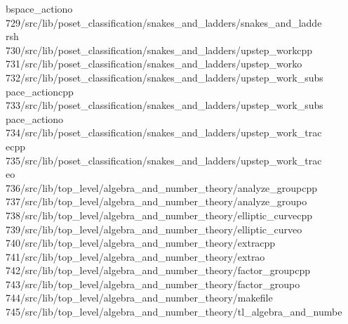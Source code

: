 \begin{tabbing}
\>bspace\_actiono\\[0pt]
729\>/src/lib/poset\_classification/snakes\_and\_ladders/snakes\_and\_ladde\\[0pt]
\>rsh\\[0pt]
730\>/src/lib/poset\_classification/snakes\_and\_ladders/upstep\_workcpp\\[0pt]
731\>/src/lib/poset\_classification/snakes\_and\_ladders/upstep\_worko\\[0pt]
732\>/src/lib/poset\_classification/snakes\_and\_ladders/upstep\_work\_subs\\[0pt]
\>pace\_actioncpp\\[0pt]
733\>/src/lib/poset\_classification/snakes\_and\_ladders/upstep\_work\_subs\\[0pt]
\>pace\_actiono\\[0pt]
734\>/src/lib/poset\_classification/snakes\_and\_ladders/upstep\_work\_trac\\[0pt]
\>ecpp\\[0pt]
735\>/src/lib/poset\_classification/snakes\_and\_ladders/upstep\_work\_trac\\[0pt]
\>eo\\[0pt]
736\>/src/lib/top\_level/algebra\_and\_number\_theory/analyze\_groupcpp\\[0pt]
737\>/src/lib/top\_level/algebra\_and\_number\_theory/analyze\_groupo\\[0pt]
738\>/src/lib/top\_level/algebra\_and\_number\_theory/elliptic\_curvecpp\\[0pt]
739\>/src/lib/top\_level/algebra\_and\_number\_theory/elliptic\_curveo\\[0pt]
740\>/src/lib/top\_level/algebra\_and\_number\_theory/extracpp\\[0pt]
741\>/src/lib/top\_level/algebra\_and\_number\_theory/extrao\\[0pt]
742\>/src/lib/top\_level/algebra\_and\_number\_theory/factor\_groupcpp\\[0pt]
743\>/src/lib/top\_level/algebra\_and\_number\_theory/factor\_groupo\\[0pt]
744\>/src/lib/top\_level/algebra\_and\_number\_theory/makefile\\[0pt]
745\>/src/lib/top\_level/algebra\_and\_number\_theory/tl\_algebra\_and\_numbe\\[0pt]

\end{tabbing}
